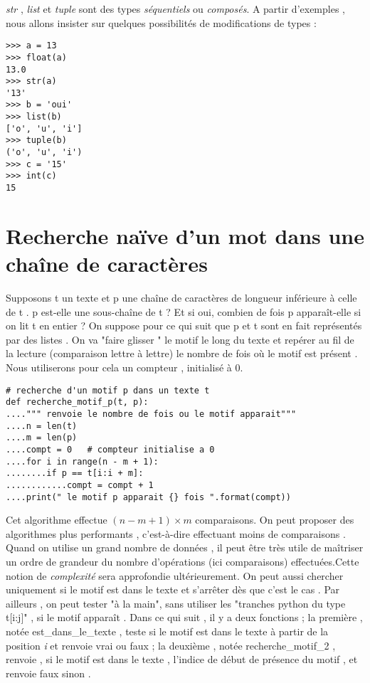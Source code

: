 \textit{str} , \textit{list} et \textit{tuple} sont des types \textit{séquentiels} ou \textit{composés}.
A partir d'exemples , nous allons insister sur quelques possibilités de modifications de types :
\begin{lstlisting}
>>> a = 13
>>> float(a)
13.0
>>> str(a)
'13'
>>> b = 'oui'
>>> list(b)
['o', 'u', 'i']
>>> tuple(b)
('o', 'u', 'i')
>>> c = '15'
>>> int(c)
15
\end{lstlisting}

\section{Recherche naïve d'un mot dans une chaîne de caractères}

Supposons t un texte et p une chaîne de caractères de longueur inférieure à celle de t . p est-elle une sous-chaîne de t ? Et si oui, combien de fois p apparaît-elle si on lit t en entier ? On suppose pour ce qui suit que p et t sont en fait représentés par des listes . On va "faire glisser " le motif le long du texte et repérer au fil de la lecture (comparaison lettre à lettre) le nombre de fois où le motif est présent . Nous utiliserons pour cela un compteur , initialisé à 0.\par
\begin{lstlisting}[frame=lines, float=ht, caption={un premier programme}]
# recherche d'un motif p dans un texte t
def recherche_motif_p(t, p):
....""" renvoie le nombre de fois ou le motif apparait"""
....n = len(t)
....m = len(p)
....compt = 0   # compteur initialise a 0
....for i in range(n - m + 1):
........if p == t[i:i + m]:
............compt = compt + 1
....print(" le motif p apparait {} fois ".format(compt))
\end{lstlisting}

Cet algorithme effectue $(n-m+1)\times m$ comparaisons. On peut proposer des algorithmes plus performants , c'est-à-dire effectuant moins de comparaisons . Quand on utilise un grand nombre de données , il peut être très utile de maîtriser un ordre de grandeur du nombre d'opérations (ici comparaisons) effectuées.Cette notion de \textit{complexité} sera approfondie ultérieurement.
\newline
On peut aussi chercher uniquement si le motif est dans le texte et s'arrêter dès que c'est le cas . Par ailleurs , on peut tester "à la main", sans utiliser les "tranches python du type t[i:j]" , si le motif
apparaît . Dans ce qui suit , il y a deux fonctions ; la première , notée est\_dans\_le\_texte , teste si le motif est dans le texte à partir de la position \textit{i} et renvoie vrai ou faux ; la deuxième , notée recherche\_motif\_2 , renvoie , si le motif est dans le texte , l'indice de début de présence du motif , et renvoie faux sinon .

